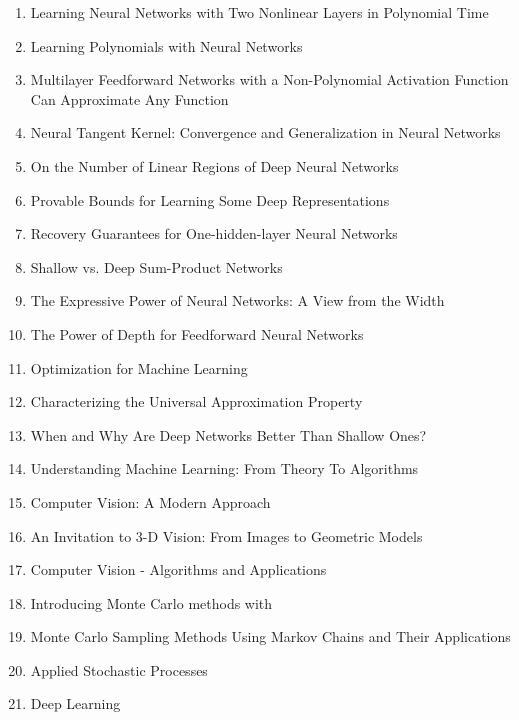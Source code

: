 \documentclass[acmlarge]{acmart}
\begin{document}
\begin{enumerate}
	\item Learning Neural Networks with Two Nonlinear Layers in Polynomial Time \cite{Goel2019LearningNN}
	\item Learning Polynomials with Neural Networks \cite{Andoni2014LearningPW}
	\item Multilayer Feedforward Networks with a Non-Polynomial Activation Function Can Approximate Any Function \cite{Leshno1993MultilayerFN}
	\item Neural Tangent Kernel: Convergence and Generalization in Neural Networks \cite{Jacot2018NeuralTK}
	\item On the Number of Linear Regions of Deep Neural Networks \cite{Montfar2014OnTN}
	\item Provable Bounds for Learning Some Deep Representations \cite{Arora2014ProvableBF}
	\item Recovery Guarantees for One-hidden-layer Neural Networks \cite{Zhong2017RecoveryGF}
	\item Shallow vs. Deep Sum-Product Networks \cite{Delalleau2011ShallowVD}
	\item The Expressive Power of Neural Networks: A View from the Width \cite{Lu2017TheEP}
	\item The Power of Depth for Feedforward Neural Networks \cite{Eldan2016ThePO}
	\item Optimization for Machine Learning \cite{10.5555/2051759}
	\item Characterizing the Universal Approximation Property \cite{Kratsios2019CharacterizingTU}
	\item When and Why Are Deep Networks Better Than Shallow Ones? \cite{Mhaskar2017WhenAW}
	\item Understanding Machine Learning: From Theory To Algorithms \cite{David2015UnderstandingML}
	\item Computer Vision: A Modern Approach \cite{Forsyth2002ComputerVA}
	\item An Invitation to 3-D Vision: From Images to Geometric Models \cite{Ma2004AnIT}
	\item Computer Vision - Algorithms and Applications \cite{Szeliski2011ComputerV}
	\item Introducing Monte Carlo methods with \cite{Robert2013IntroducingMC}
	\item Monte Carlo Sampling Methods Using Markov Chains and Their Applications \cite{Hastings1970MonteCS}
	\item Applied Stochastic Processes \cite{Liao2013AppliedSP}
	\item Deep Learning \cite{Goodfellow-et-al-2016}

\end{enumerate}
\end{document}
